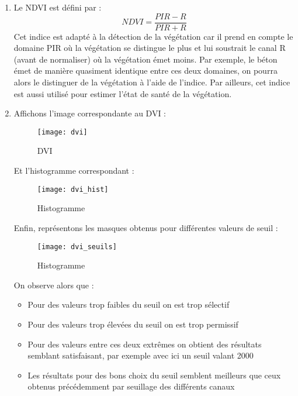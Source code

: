 \documentclass[12pt,a4paper,titlepage]{article}
\begin{document}
\begin{enumerate}
{            Ainsi, d'après le graphique, la végétation se distingue le plus des autres
            éléments dans la bande PIR mais on peut encore le confondre avec le béton.
        }

    \item{
            Le NDVI est défini par : $$ NDVI = \frac{PIR - R}{PIR + R} $$
            Cet indice est adapté à la détection de la végétation car il prend en compte le
            domaine PIR où la végétation se distingue le plus et lui soustrait le canal R (avant
            de normaliser) où la végétation émet moins. Par exemple, le béton émet de
            manière quasiment identique entre ces deux domaines, on pourra alors le distinguer
            de la végétation à l'aide de l'indice. Par ailleurs, cet indice est aussi utilisé pour estimer
            l'état de santé de la végétation.
        }

    \item{
            Affichons l'image correspondante au DVI :

            \begin{figure}[H]
                \caption{DVI}
                \texttt{[image: dvi]}
                \centering
            \end{figure}

            Et l'histogramme correspondant :

            \begin{figure}[H]
                \caption{Histogramme}
                \texttt{[image: dvi\_hist]}
                \centering
            \end{figure}

            Enfin, représentons les masques obtenus pour différentes valeurs de seuil :

            \begin{figure}[H]
                \caption{Histogramme}
                \texttt{[image: dvi\_seuils]}
                \centering
            \end{figure}

            On observe alors que :

            \begin{itemize}
                \item{Pour des valeurs trop faibles du seuil on est trop sélectif}
                \item{Pour des valeurs trop élevées du seuil on est trop permissif}
                \item{Pour des valeurs entre ces deux extrêmes on obtient des résultats
                    semblant satisfaisant, par exemple avec ici un seuil valant 2000}
                \item{Les résultats pour des bons choix du seuil semblent meilleurs que ceux
                    obtenus précédemment par seuillage des différents canaux}
            \end{itemize}
        }


\end{enumerate}
\end{document}
